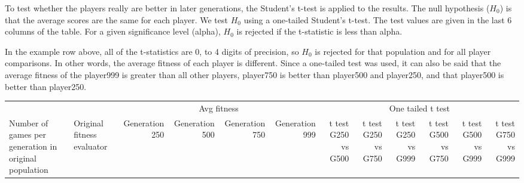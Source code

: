 \begin{landscape}
To test whether the players really are better in later generations, the
Student's t-test is applied to the results. The null hypothesis ($H_{0}$) is
that the average scores are the same for each player. We test $H_{0}$ using a
one-tailed Student's t-test. The test values are given in the last 6 columns of
the table. For a given significance level (alpha), $H_{0}$ is rejected if the
t-statistic is less than alpha.

In the example row above, all of the t-statistics are 0, to 4 digits of
precision, so $H_{0}$ is rejected for that population and for all player
comparisons. In other words, the average fitness of each player is different.
Since a one-tailed test was used, it can also be said that the average fitness
of the player999 is greater than all other players, player750 is better than
player500 and player250, and that player500 is better than player250.

\begin{table}[ht]
  \centering
    \begin{tabularx}{\linewidth}{|p{1in}|p{1in}|r|r|r|r|r|r|r|r|r|r|}
\cline{3-12}    \multicolumn{1}{l}{} &  & \multicolumn{4}{c|}{Avg fitness} & \multicolumn{6}{c|}{One tailed t test} \\ \cline{1-12}
    Number of games per generation in original population
    & Original fitness evaluator 
    & \multicolumn{1}{p{0.7in}|}{Generation 250} 
    & \multicolumn{1}{p{0.7in}|}{Generation 500}
    & \multicolumn{1}{p{0.7in}|}{Generation 750}
    & \multicolumn{1}{p{0.7in}|}{Generation 999}
    & \multicolumn{1}{X|}{t test G250 vs G500} 
    & \multicolumn{1}{X|}{t test G250 vs G750}
    & \multicolumn{1}{X|}{t test G250 vs G999}
    & \multicolumn{1}{X|}{t test G500 vs G750}
    & \multicolumn{1}{X|}{t test G500 vs G999}
    & \multicolumn{1}{X|}{t test G750 vs G999} \\ \cline{1-12}


\end{tabularx}
\end{table}
\end{landscape}

